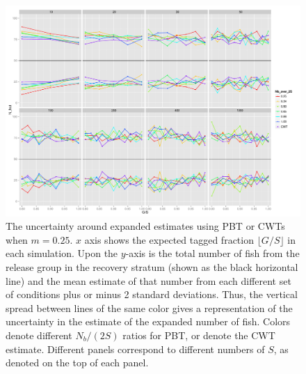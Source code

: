 \documentclass[11pt]{article}
\begin{document}
\begin{figure}
\includegraphics[width = .93\textwidth]{./images/sd_line_horns_m_0_25.pdf}
\caption{The uncertainty around expanded estimates using PBT or CWTs when $m = 0.25$.  $x$ axis shows the
expected tagged fraction $\lfloor G/S \rfloor$ in each simulation. Upon the $y$-axis is the total number of fish from the
release group in the recovery stratum (shown as the black horizontal line) and the mean estimate of that number from each different set of 
conditions plus or minus 2 standard deviations.  Thus, the vertical spread between lines of the same color gives a representation
of the uncertainty in the estimate of the expanded number of fish. Colors denote different $N_b/(2S)$ ratios for PBT, or denote
the CWT estimate.  Different
panels correspond to different numbers of $S$, as denoted on the top of each panel.
\label{fig:horn0.25}}
\end{figure}
\end{document}
